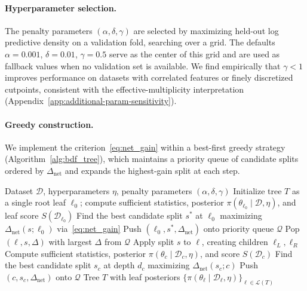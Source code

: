 \documentclass[twoside,11pt]{article}
\begin{document}
\paragraph{Hyperparameter selection.}
The penalty parameters $(\alpha, \delta, \gamma)$ are selected by maximizing held-out log predictive density on a validation fold, searching over a grid. The defaults $\alpha = 0.001$, $\delta = 0.01$, $\gamma = 0.5$ serve as the center of this grid and are used as fallback values when no validation set is available. We find empirically that $\gamma < 1$ improves performance on datasets with correlated features or finely discretized cutpoints, consistent with the effective-multiplicity interpretation (Appendix~\ref{app:additional-param-sensitivity}).

\paragraph{Greedy construction.}
We implement the criterion~\eqref{eq:net_gain} within a best-first greedy strategy (Algorithm~\ref{alg:bdf_tree}), which maintains a priority queue of candidate splits ordered by $\Delta_{\mathrm{net}}$ and expands the highest-gain split at each step.

\begin{algorithm}[t]
\caption{Greedy construction of a single Bayesian distributional tree}\label{alg:bdf_tree}
\begin{algorithmic}[1]
\REQUIRE Dataset $\mathcal{D}$, hyperparameters $\eta$, penalty parameters $(\alpha, \delta, \gamma)$
\STATE Initialize tree $T$ as a single root leaf $\ell_0$; compute sufficient statistics, posterior $\pi(\theta_{\ell_0} \mid \mathcal{D}, \eta)$, and leaf score $S(\mathcal{D}_{\ell_0})$
\STATE Find the best candidate split $s^*$ at $\ell_0$ maximizing $\Delta_{\mathrm{net}}(s;\ell_0)$ via~\eqref{eq:net_gain}
    \STATE Push $(\ell_0, s^*, \Delta_{\mathrm{net}})$ onto priority queue $\mathcal{Q}$
\ENDIF
{}
    \STATE Pop $(\ell, s, \Delta)$ with largest $\Delta$ from $\mathcal{Q}$
    \STATE Apply split $s$ to $\ell$, creating children $\ell_L, \ell_R$
        \STATE Compute sufficient statistics, posterior $\pi(\theta_c \mid \mathcal{D}_c, \eta)$, and score $S(\mathcal{D}_c)$
        \STATE Find the best candidate split $s_c$ at depth $d_c$ maximizing $\Delta_{\mathrm{net}}(s_c; c)$
            \STATE Push $(c, s_c, \Delta_{\mathrm{net}})$ onto $\mathcal{Q}$
        \ENDIF
    \ENDFOR
\ENDWHILE
\RETURN Tree $T$ with leaf posteriors $\{\pi(\theta_\ell \mid \mathcal{D}_\ell, \eta)\}_{\ell \in \mathcal{L}(T)}$
\end{algorithmic}
\end{algorithm}
\end{document}
